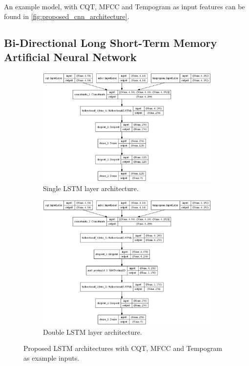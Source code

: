 An example model, with CQT, MFCC and Tempogram as input features can be found in \autoref{fig:proposed_cnn_architecture}.

\subsection[Bi-LSTM]{Bi-Directional Long Short-Term Memory Artificial Neural Network}
\begin{figure}[t]
    \centering
    \begin{subfigure}{\textwidth}
        \centering
        \includegraphics[width=.9\linewidth]{images/lstm_architecture_single}
        \caption{Single LSTM layer architecture.}
        \label{fig:lstm_single}
    \end{subfigure}
    \par\bigskip
    \begin{subfigure}{\textwidth}
        \centering
        \includegraphics[width=.9\linewidth]{images/lstm_architecture_multi}
        \caption{Double LSTM layer architecture.}
        \label{fig:lstm_double}
    \end{subfigure}
    
    \caption{Proposed LSTM architectures with CQT, MFCC and Tempogram as example inputs.}
    \label{fig:proposed_lstm_architecture}
\end{figure}
